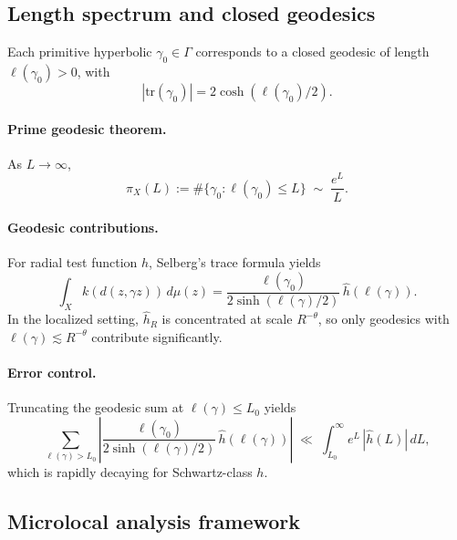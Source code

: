 \medskip

\subsection{Length spectrum and closed geodesics}\label{subsec:geodesics}

Each primitive hyperbolic $\gamma_0\in\Gamma$ corresponds to a closed geodesic of length $\ell(\gamma_0)>0$, with
\begin{equation}\label{eq:trace-length}
  |\mathrm{tr}(\gamma_0)| = 2\cosh(\ell(\gamma_0)/2).
\end{equation}

\paragraph{Prime geodesic theorem.}
As $L\to\infty$,
\begin{equation}\label{eq:PGT}
  \pi_X(L) := \#\{\gamma_0:\ell(\gamma_0)\le L\} \;\sim\; \frac{e^L}{L}.
\end{equation}

\paragraph{Geodesic contributions.}
For radial test function $h$, Selberg’s trace formula yields
\begin{equation}\label{eq:geodesic-contribution}
  \int_X k(d(z,\gamma z))\,d\mu(z)
  = \frac{\ell(\gamma_0)}{2\sinh(\ell(\gamma)/2)}\,\widehat{h}(\ell(\gamma)).
\end{equation}
In the localized setting, $\widehat{h}_R$ is concentrated at scale $R^{-\theta}$, so only geodesics with $\ell(\gamma)\lesssim R^{-\theta}$ contribute significantly.

\paragraph{Error control.}
Truncating the geodesic sum at $\ell(\gamma)\le L_0$ yields
\begin{equation}\label{eq:geodesic-error}
  \sum_{\ell(\gamma)>L_0}
  \left|\frac{\ell(\gamma_0)}{2\sinh(\ell(\gamma)/2)}\,\widehat{h}(\ell(\gamma))\right|
  \;\ll\;\int_{L_0}^\infty e^L\,|\widehat{h}(L)|\,dL,
\end{equation}
which is rapidly decaying for Schwartz-class $h$.

\subsection{Microlocal analysis framework}\label{subsec:microlocal}

